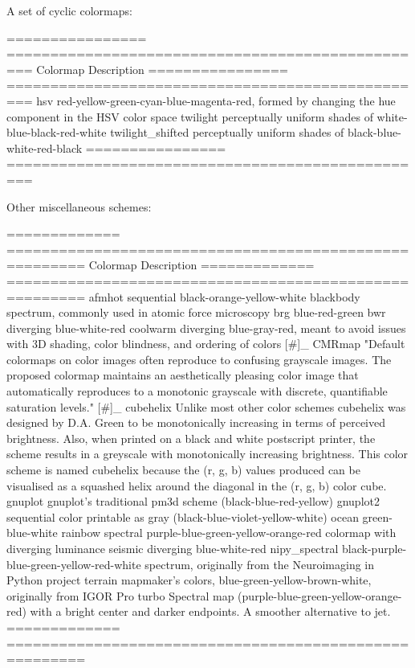 \begin{DoxyVerb}
A set of cyclic colormaps:

  ================  =================================================
  Colormap          Description
  ================  =================================================
  hsv               red-yellow-green-cyan-blue-magenta-red, formed by
                    changing the hue component in the HSV color space
  twilight          perceptually uniform shades of
                    white-blue-black-red-white
  twilight_shifted  perceptually uniform shades of
                    black-blue-white-red-black
  ================  =================================================

Other miscellaneous schemes:

  ============= =======================================================
  Colormap      Description
  ============= =======================================================
  afmhot        sequential black-orange-yellow-white blackbody
                spectrum, commonly used in atomic force microscopy
  brg           blue-red-green
  bwr           diverging blue-white-red
  coolwarm      diverging blue-gray-red, meant to avoid issues with 3D
                shading, color blindness, and ordering of colors [#]_
  CMRmap        "Default colormaps on color images often reproduce to
                confusing grayscale images. The proposed colormap
                maintains an aesthetically pleasing color image that
                automatically reproduces to a monotonic grayscale with
                discrete, quantifiable saturation levels." [#]_
  cubehelix     Unlike most other color schemes cubehelix was designed
                by D.A. Green to be monotonically increasing in terms
                of perceived brightness. Also, when printed on a black
                and white postscript printer, the scheme results in a
                greyscale with monotonically increasing brightness.
                This color scheme is named cubehelix because the (r, g, b)
                values produced can be visualised as a squashed helix
                around the diagonal in the (r, g, b) color cube.
  gnuplot       gnuplot's traditional pm3d scheme
                (black-blue-red-yellow)
  gnuplot2      sequential color printable as gray
                (black-blue-violet-yellow-white)
  ocean         green-blue-white
  rainbow       spectral purple-blue-green-yellow-orange-red colormap
                with diverging luminance
  seismic       diverging blue-white-red
  nipy_spectral black-purple-blue-green-yellow-red-white spectrum,
                originally from the Neuroimaging in Python project
  terrain       mapmaker's colors, blue-green-yellow-brown-white,
                originally from IGOR Pro
  turbo         Spectral map (purple-blue-green-yellow-orange-red) with
                a bright center and darker endpoints. A smoother
                alternative to jet.
  ============= =======================================================


\end{DoxyVerb}
